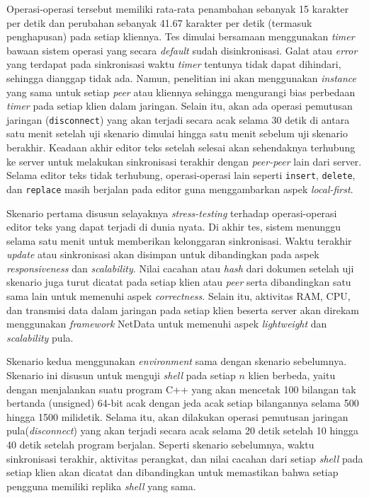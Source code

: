 Operasi-operasi tersebut memiliki rata-rata penambahan sebanyak 15 karakter per detik dan perubahan sebanyak 41.67 karakter per detik (termasuk penghapusan) pada setiap kliennya. Tes dimulai bersamaan menggunakan \textit{timer} bawaan sistem operasi yang secara \textit{default} sudah disinkronisasi. Galat atau \textit{error} yang terdapat pada sinkronisasi waktu \textit{timer} tentunya tidak dapat dihindari, sehingga dianggap tidak ada. Namun, penelitian ini akan menggunakan \textit{instance} yang sama untuk setiap \textit{peer} atau kliennya sehingga mengurangi bias perbedaan \textit{timer} pada setiap klien dalam jaringan. Selain itu, akan ada operasi pemutusan jaringan (\texttt{disconnect}) yang akan terjadi secara acak selama 30 detik di antara satu menit setelah uji skenario dimulai hingga satu menit sebelum uji skenario berakhir. Keadaan akhir editor teks setelah selesai akan sehendaknya terhubung ke server untuk melakukan sinkronisasi terakhir dengan \textit{peer-peer} lain dari server. Selama editor teks tidak terhubung, operasi-operasi lain seperti \texttt{insert}, \texttt{delete}, dan \texttt{replace} masih berjalan pada editor guna menggambarkan aspek \textit{local-first}.

Skenario pertama disusun selayaknya \textit{stress-testing} terhadap operasi-operasi editor teks yang dapat terjadi di dunia nyata. Di akhir tes, sistem menunggu selama satu menit untuk memberikan kelonggaran sinkronisasi. Waktu terakhir \textit{update} atau sinkronisasi akan disimpan untuk dibandingkan pada aspek \textit{responsiveness} dan \textit{scalability}. Nilai cacahan atau \textit{hash} dari dokumen setelah uji skenario juga turut dicatat pada setiap klien atau \textit{peer} serta dibandingkan satu sama lain untuk memenuhi aspek \textit{correctness}. Selain itu, aktivitas RAM, CPU, dan transmisi data dalam jaringan pada setiap klien beserta server akan direkam menggunakan \textit{framework} NetData untuk memenuhi aspek \textit{lightweight} dan \textit{scalability} pula.

Skenario kedua menggunakan \textit{environment} sama dengan skenario sebelumnya. Skenario ini disusun untuk menguji \textit{shell} pada setiap $n$ klien berbeda, yaitu dengan menjalankan suatu program C++ yang akan mencetak 100 bilangan tak bertanda (unsigned) 64-bit acak dengan jeda acak setiap bilangannya selama 500 hingga 1500 milidetik. Selama itu, akan dilakukan operasi pemutusan jaringan pula(\textit{disconnect}) yang akan terjadi secara acak selama 20 detik setelah 10 hingga 40 detik setelah program berjalan. Seperti skenario sebelumnya, waktu sinkronisasi terakhir, aktivitas perangkat, dan nilai cacahan dari setiap \textit{shell} pada setiap klien akan dicatat dan dibandingkan untuk memastikan bahwa setiap pengguna memiliki replika \textit{shell} yang sama.

